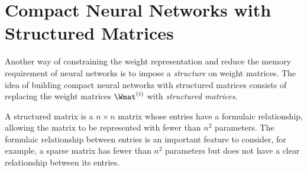%



\section{Compact Neural Networks with Structured Matrices}
\label{section:p1-ch3-compact_neural_networks_with_structured_matrices}


Another way of constraining the weight representation and reduce the memory requirement of neural networks is to impose a \emph{structure} on weight matrices. 
The idea of building compact neural networks with structured matrices consists of replacing the weight matrices $\Wmat^{(i)}$ with \emph{structured matrices}.

A structured matrix is a $n \times n$ matrix whose entries have a formulaic relationship, allowing the matrix to be represented with fewer than $n^2$ parameters.
The formulaic relationship between entries is an important feature to consider, for example, a sparse matrix has fewer than $n^2$ parameters but does not have a clear relationship between its entries.

